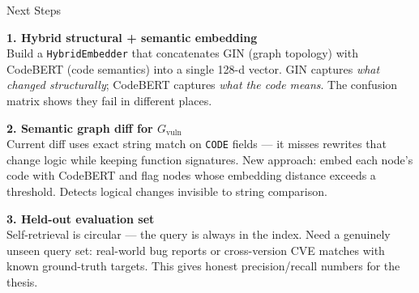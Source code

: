 \documentclass[aspectratio=169,10pt]{beamer}
\begin{document}
\begin{frame}{Next Steps}

  \textbf{1. Hybrid structural + semantic embedding}\\[2pt]
  Build a \texttt{HybridEmbedder} that concatenates GIN (graph topology)
  with CodeBERT (code semantics) into a single 128-d vector.
  GIN captures \emph{what changed structurally}; CodeBERT captures
  \emph{what the code means}. The confusion matrix shows they fail
  in different places.

  \vspace{0.8em}
  \textbf{2. Semantic graph diff for $G_{\text{vuln}}$}\\[2pt]
  Current diff uses exact string match on \texttt{CODE} fields — it
  misses rewrites that change logic while keeping function signatures.
  New approach: embed each node's code with CodeBERT and flag nodes
  whose embedding distance exceeds a threshold. Detects logical
  changes invisible to string comparison.

  \vspace{0.8em}
  \textbf{3. Held-out evaluation set}\\[2pt]
  Self-retrieval is circular — the query is always in the index.
  Need a genuinely unseen query set: real-world bug reports or
  cross-version CVE matches with known ground-truth targets.
  This gives honest precision/recall numbers for the thesis.




\end{frame}
\end{document}
